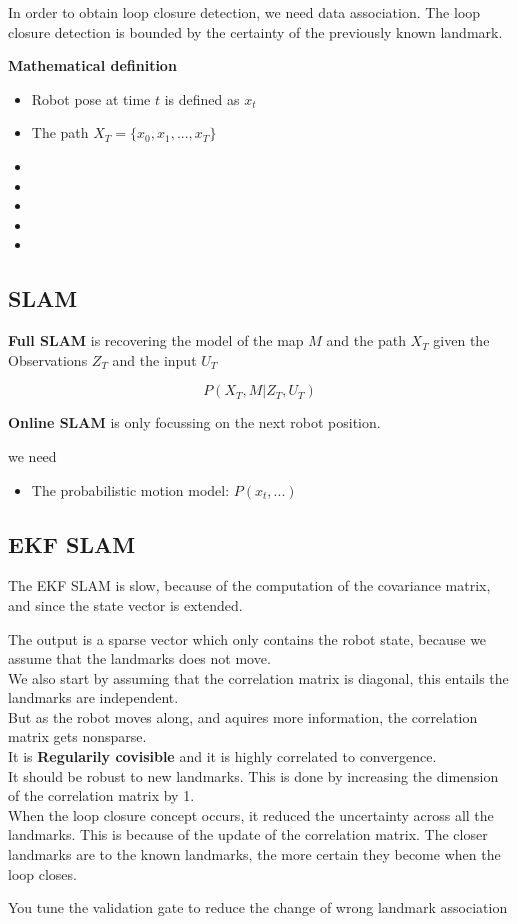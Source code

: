 \documentclass[a4paper]{article}
\begin{document}
In order to obtain loop closure detection, we need data association. The loop closure detection is bounded by the certainty of the previously known landmark. 


\vspace{5pt}

\textbf{Mathematical definition} 
\begin{itemize}
	\item Robot pose at time $ t $ is defined as $ x_t $
	\item The path $ X_T = \{x_0,x_1,...,x_T\} $
	\item 
		\item
		\item
		\item
		\item
\end{itemize}

\subsection{SLAM}

\textbf{Full SLAM}  is recovering the model of the map $ M $ and the path  $ X_T $ given the Observations  $ Z_T $ and the input  $ U_T $

\begin{equation}
P(X_T, M | Z_T, U_T)
\end{equation}


\textbf{Online SLAM} is only focussing on the next robot position. 

we need
\begin{itemize}
	\item The probabilistic motion model: $ P(x_t, ...) $
\end{itemize}


\subsection{EKF SLAM}
The EKF SLAM is slow, because of the computation of the covariance matrix, and since the state vector is extended. 

The output is a sparse vector which only contains the robot state, because we assume that the landmarks does not move. \\
We also start by assuming that the correlation matrix is diagonal, this entails the landmarks are independent. \\
But as the robot moves along, and aquires more information, the correlation matrix gets nonsparse. \\
It is \textbf{Regularily covisible} and it is highly correlated to convergence.\\
It should be robust to new landmarks. This is done by increasing the dimension of the correlation matrix by 1. \\
When the loop closure concept occurs, it reduced the uncertainty across all the landmarks. This is because of the update of the correlation matrix. The closer landmarks are to the known landmarks, the more certain they become when the loop closes. 

You tune the validation gate to reduce the change of wrong landmark association
\end{document}
